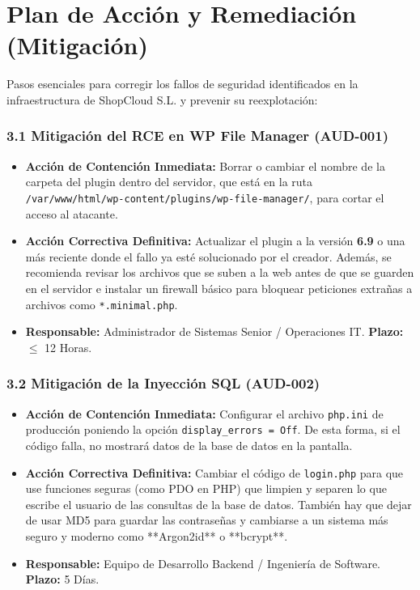 \documentclass[11pt,a4paper]{report}
\begin{document}
\newpage
\chapter{Plan de Acción y Remediación (Mitigación)}
Pasos esenciales para corregir los fallos de seguridad identificados en la infraestructura de ShopCloud S.L. y prevenir su reexplotación:

\subsection*{3.1 Mitigación del RCE en WP File Manager (AUD-001)}
\begin{itemize}
    \item \textbf{Acción de Contención Inmediata:} Borrar o cambiar el nombre de la carpeta del plugin dentro del servidor, que está en la ruta \texttt{/var/www/html/wp-content/plugins/wp-file-manager/}, para cortar el acceso al atacante.
    \item \textbf{Acción Correctiva Definitiva:} Actualizar el plugin a la versión \textbf{6.9} o una más reciente donde el fallo ya esté solucionado por el creador. Además, se recomienda revisar los archivos que se suben a la web antes de que se guarden en el servidor e instalar un firewall básico para bloquear peticiones extrañas a archivos como \texttt{*.minimal.php}.
    \item \textbf{Responsable:} Administrador de Sistemas Senior / Operaciones IT. \textbf{Plazo:} $\le$ 12 Horas.
\end{itemize}

\subsection*{3.2 Mitigación de la Inyección SQL (AUD-002)}
\begin{itemize}
    \item \textbf{Acción de Contención Inmediata:} Configurar el archivo \texttt{php.ini} de producción poniendo la opción \texttt{display\_errors = Off}. De esta forma, si el código falla, no mostrará datos de la base de datos en la pantalla.
    \item \textbf{Acción Correctiva Definitiva:} Cambiar el código de \texttt{login.php} para que use funciones seguras (como PDO en PHP) que limpien y separen lo que escribe el usuario de las consultas de la base de datos. También hay que dejar de usar MD5 para guardar las contraseñas y cambiarse a un sistema más seguro y moderno como **Argon2id** o **bcrypt**.
    \item \textbf{Responsable:} Equipo de Desarrollo Backend / Ingeniería de Software. \textbf{Plazo:} 5 Días.
\end{itemize}
\end{document}
